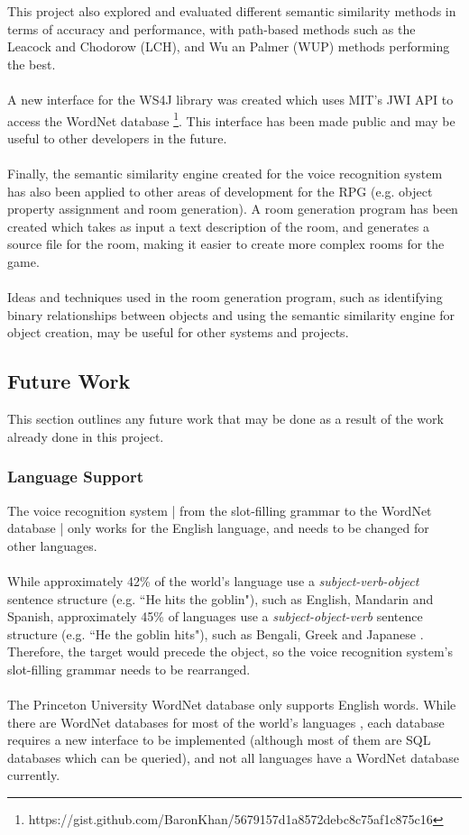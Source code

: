 \documentclass[11pt]{article}
\begin{document}
This project also explored and evaluated different semantic similarity methods in terms of accuracy and performance, with path-based methods such as the Leacock and Chodorow (LCH), and Wu an Palmer (WUP) methods performing the best.
\\
\\
A new interface for the WS4J library was created which uses MIT's JWI API to access the WordNet database \footnote{https://gist.github.com/BaronKhan/5679157d1a8572debc8c75af1c875c16}. This interface has been made public and may be useful to other developers in the future.
\\
\\
Finally, the semantic similarity engine created for the voice recognition system has also been applied to other areas of development for the RPG (e.g. object property assignment and room generation). A room generation program has been created which takes as input a text description of the room, and generates a source file for the room, making it easier to create more complex rooms for the game.
\\
\\
Ideas and techniques used in the room generation program, such as identifying binary relationships between objects and using the semantic similarity engine for object creation, may be useful for other systems and projects.

\subsection{Future Work}

This section outlines any future work that may be done as a result of the work already done in this project.

\subsubsection{Language Support}

The voice recognition system | from the slot-filling grammar to the WordNet database | only works for the English language, and needs to be changed for other languages.
\\
\\
While approximately 42\% of the world's language use a \textit{subject-verb-object} sentence structure (e.g. ``He hits the goblin"), such as English, Mandarin and Spanish, approximately 45\% of languages use a \textit{subject-object-verb} sentence structure (e.g. ``He the goblin hits"), such as Bengali, Greek and Japanese \cite{RefWorks:130}. Therefore, the target would precede the object, so the voice recognition system's slot-filling grammar needs to be rearranged.
\\
\\
The Princeton University WordNet database only supports English words. While there are WordNet databases for most of the world's languages \cite{RefWorks:131}, each database requires a new interface to be implemented (although most of them are SQL databases which can be queried), and not all languages have a WordNet database currently.
\end{document}
